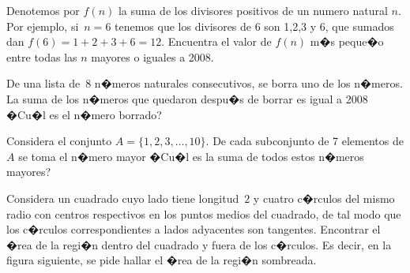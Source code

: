 \begin{Problema}{3}
  Denotemos por $f(n)$ la suma de los divisores positivos de un numero
  natural $n$. Por ejemplo, si~$n=6$ tenemos que los divisores de 6
  son 1,2,3 y 6, que sumados dan $f(6)=1+2+3+6=12$. Encuentra el valor
  de $f(n)$ m�s peque�o entre todas las $n$ mayores o iguales a 2008.
\end{Problema}

\begin{Solucion}
  
\end{Solucion}

\begin{Problema}{4}
  De una lista de~8 n�meros naturales consecutivos, se borra uno de
  los n�meros. La suma de los n�meros que quedaron despu�s de borrar
  es igual a 2008 �Cu�l es el n�mero borrado?
\end{Problema}

\begin{Solucion}
  
\end{Solucion}

\begin{Problema}{5}
  Considera el conjunto $A=\{1,2,3,\ldots,10\}$.  De cada subconjunto
  de 7 elementos de $A$ se toma el n�mero mayor �Cu�l es la suma de
  todos estos n�meros mayores?
\end{Problema}

\begin{Solucion}
  
\end{Solucion}

\begin{Problema}{6}
  Considera un cuadrado cuyo lado tiene longitud~$2$ y cuatro
  c�rculos del mismo radio con centros respectivos en los puntos
  medios del cuadrado, de tal modo que los c�rculos correspondientes a
  lados adyacentes son tangentes.  Encontrar el �rea de la regi�n
  dentro del cuadrado y fuera de los c�rculos. Es decir, en la figura
  siguiente, se pide hallar el �rea de la regi�n sombreada.

  \begin{center}

  \end{center}
\end{Problema}


